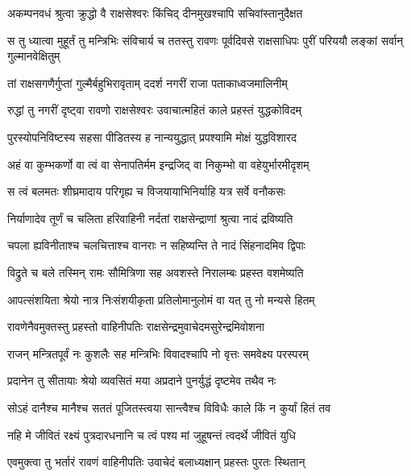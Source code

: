
\twolineshloka
{अकम्पनवधं श्रुत्वा क्रुद्धो वै राक्षसेश्वरः}
{किंचिद् दीनमुखश्चापि सचिवांस्तानुदैक्षत} %

\threelineshloka
{स तु ध्यात्वा मुहूर्तं तु मन्त्रिभिः संविचार्य च}
{ततस्तु रावणः पूर्वदिवसे राक्षसाधिपः}
{पुरीं परिययौ लङ्कां सर्वान् गुल्मानवेक्षितुम्} %

\twolineshloka
{तां राक्षसगणैर्गुप्तां गुल्मैर्बहुभिरावृताम्}
{ददर्श नगरीं राजा पताकाध्वजमालिनीम्} %

\twolineshloka
{रुद्धां तु नगरीं दृष्ट्वा रावणो राक्षसेश्वरः}
{उवाचात्महितं काले प्रहस्तं युद्धकोविदम्} %

\twolineshloka
{पुरस्योपनिविष्टस्य सहसा पीडितस्य ह}
{नान्ययुद्धात् प्रपश्यामि मोक्षं युद्धविशारद} %

\twolineshloka
{अहं वा कुम्भकर्णो वा त्वं वा सेनापतिर्मम}
{इन्द्रजिद् वा निकुम्भो वा वहेयुर्भारमीदृशम्} %

\twolineshloka
{स त्वं बलमतः शीघ्रमादाय परिगृह्य च}
{विजयायाभिनिर्याहि यत्र सर्वे वनौकसः} %

\twolineshloka
{निर्याणादेव तूर्णं च चलिता हरिवाहिनी}
{नर्दतां राक्षसेन्द्राणां श्रुत्वा नादं द्रविष्यति} %

\twolineshloka
{चपला ह्यविनीताश्च चलचित्ताश्च वानराः}
{न सहिष्यन्ति ते नादं सिंहनादमिव द्विपाः} %

\twolineshloka
{विद्रुते च बले तस्मिन् रामः सौमित्रिणा सह}
{अवशस्ते निरालम्बः प्रहस्त वशमेष्यति} %

\twolineshloka
{आपत्संशयिता श्रेयो नात्र निःसंशयीकृता}
{प्रतिलोमानुलोमं वा यत् तु नो मन्यसे हितम्} %

\twolineshloka
{रावणेनैवमुक्तस्तु प्रहस्तो वाहिनीपतिः}
{राक्षसेन्द्रमुवाचेदमसुरेन्द्रमिवोशना} %

\twolineshloka
{राजन् मन्त्रितपूर्वं नः कुशलैः सह मन्त्रिभिः}
{विवादश्चापि नो वृत्तः समवेक्ष्य परस्परम्} %

\twolineshloka
{प्रदानेन तु सीतायाः श्रेयो व्यवसितं मया}
{अप्रदाने पुनर्युद्धं दृष्टमेव तथैव नः} %

\twolineshloka
{सोऽहं दानैश्च मानैश्च सततं पूजितस्त्वया}
{सान्त्वैश्च विविधैः काले किं न कुर्यां हितं तव} %

\twolineshloka
{नहि मे जीवितं रक्ष्यं पुत्रदारधनानि च}
{त्वं पश्य मां जुहूषन्तं त्वदर्थे जीवितं युधि} %

\twolineshloka
{एवमुक्त्वा तु भर्तारं रावणं वाहिनीपतिः}
{उवाचेदं बलाध्यक्षान् प्रहस्तः पुरतः स्थितान्} %


